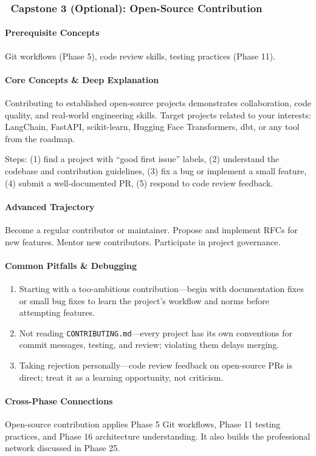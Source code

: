 \documentclass[11pt, a4paper, oneside]{report}
\newcommand{\awareness}[1]{\subsubsection{\texorpdfstring{\fcolorbox{gray!50}{gray!10}{\footnotesize\bfseries\color{gray!50!black} AWARENESS}~#1}{#1}}}
\begin{document}
\awareness{Capstone 3 (Optional): Open-Source Contribution}

\paragraph{Prerequisite Concepts} Git workflows (Phase 5), code review skills, testing practices (Phase 11).

\paragraph{Core Concepts \& Deep Explanation} Contributing to established open-source projects demonstrates collaboration, code quality, and real-world engineering skills. Target projects related to your interests: LangChain, FastAPI, scikit-learn, Hugging Face Transformers, dbt, or any tool from the roadmap.

Steps: (1) find a project with ``good first issue'' labels, (2) understand the codebase and contribution guidelines, (3) fix a bug or implement a small feature, (4) submit a well-documented PR, (5) respond to code review feedback.

\paragraph{Advanced Trajectory} Become a regular contributor or maintainer. Propose and implement RFCs for new features. Mentor new contributors. Participate in project governance.

\paragraph{Common Pitfalls \& Debugging}
\begin{enumerate}[leftmargin=*]
\item Starting with a too-ambitious contribution---begin with documentation fixes or small bug fixes to learn the project's workflow and norms before attempting features.
\item Not reading \texttt{CONTRIBUTING.md}---every project has its own conventions for commit messages, testing, and review; violating them delays merging.
\item Taking rejection personally---code review feedback on open-source PRs is direct; treat it as a learning opportunity, not criticism.
\end{enumerate}

\paragraph{Cross-Phase Connections} Open-source contribution applies Phase 5 Git workflows, Phase 11 testing practices, and Phase 16 architecture understanding. It also builds the professional network discussed in Phase 25.
\end{document}
